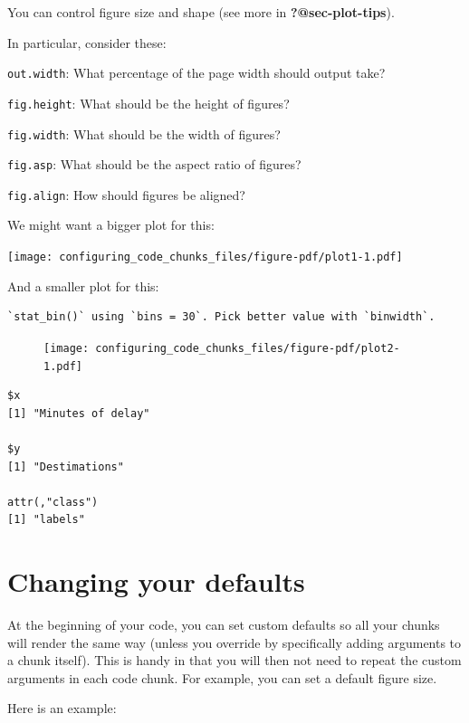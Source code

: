 \documentclass[
  letterpaper,
  DIV=11,
  numbers=noendperiod]{scrreprt}
\newenvironment{Shaded}{\begin{snugshade}}{\end{snugshade}}
\newcommand{\AttributeTok}[1]{\textcolor[rgb]{0.49,0.56,0.16}{#1}}
\newcommand{\ConstantTok}[1]{\textcolor[rgb]{0.53,0.00,0.00}{#1}}
\newcommand{\DecValTok}[1]{\textcolor[rgb]{0.25,0.63,0.44}{#1}}
\newcommand{\FunctionTok}[1]{\textcolor[rgb]{0.02,0.16,0.49}{#1}}
\newcommand{\NormalTok}[1]{\textcolor[rgb]{0.00,0.44,0.13}{#1}}
\newcommand{\SpecialCharTok}[1]{\textcolor[rgb]{0.25,0.44,0.63}{#1}}
\newcommand{\StringTok}[1]{\textcolor[rgb]{0.25,0.44,0.63}{#1}}
\begin{document}
You can control figure size and shape (see more in
\textbf{?@sec-plot-tips}).

In particular, consider these:

\texttt{out.width}: What percentage of the page width should output
take?

\texttt{fig.height}: What should be the height of figures?

\texttt{fig.width}: What should be the width of figures?

\texttt{fig.asp}: What should be the aspect ratio of figures?

\texttt{fig.align}: How should figures be aligned?

We might want a bigger plot for this:

\texttt{[image: configuring\_code\_chunks\_files/figure-pdf/plot1-1.pdf]}

And a smaller plot for this:

\begin{verbatim}
`stat_bin()` using `bins = 30`. Pick better value with `binwidth`.
\end{verbatim}

\begin{figure}

\texttt{[image: configuring\_code\_chunks\_files/figure-pdf/plot2-1.pdf]} \hfill{}

\end{figure}

\begin{verbatim}
$x
[1] "Minutes of delay"

$y
[1] "Destimations"

attr(,"class")
[1] "labels"
\end{verbatim}

\hypertarget{changing-your-defaults}{%
\section{Changing your defaults}\label{changing-your-defaults}}

At the beginning of your code, you can set custom defaults so all your
chunks will render the same way (unless you override by specifically
adding arguments to a chunk itself). This is handy in that you will then
not need to repeat the custom arguments in each code chunk. For example,
you can set a default figure size.

Here is an example:

\begin{Shaded}
\end{Shaded}
\end{document}

